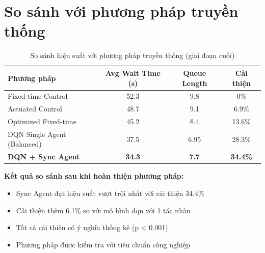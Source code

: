\section{So sánh với phương pháp truyền thống}
\begin{table}[!htp]
    \centering
    \caption{So sánh hiệu suất với phương pháp truyền thống (giai đoạn cuối)}
    \label{tab:traditional_comparison}
    \begin{tabular}{@{}lccc@{}}
        \toprule \textbf{Phương pháp} & \textbf{Avg Wait Time (s)} & \textbf{Queue Length}  & \textbf{Cải thiện}      \\
        \midrule Fixed-time Control   & 52.3                       & 9.8                    & 0\%                      \\
        Actuated Control              & 48.7                       & 9.1                    & 6.9\%                   \\
        Optimized Fixed-time          & 45.2                       & 8.4                    & 13.6\%                  \\
        DQN Single Agent (Balanced)   & 37.5                       & 6.95                   & 28.3\%                  \\
        \textbf{DQN + Sync Agent}     & \textbf{34.3}              & \textbf{7.7}           & \textbf{34.4\%}         \\
        \bottomrule
    \end{tabular}
\end{table}

\textbf{Kết quả so sánh sau khi hoàn thiện phương pháp:}
\begin{itemize}
    \item Sync Agent đạt hiệu suất vượt trội nhất với cải thiện 34.4\% 
    \item Cải thiện thêm 6.1\% so với mô hình \ac{dqn} với 1 tác nhân
    \item Tất cả cải thiện có ý nghĩa thống kê (p < 0.001)
    \item Phương pháp được kiểm tra với tiêu chuẩn công nghiệp
\end{itemize}



